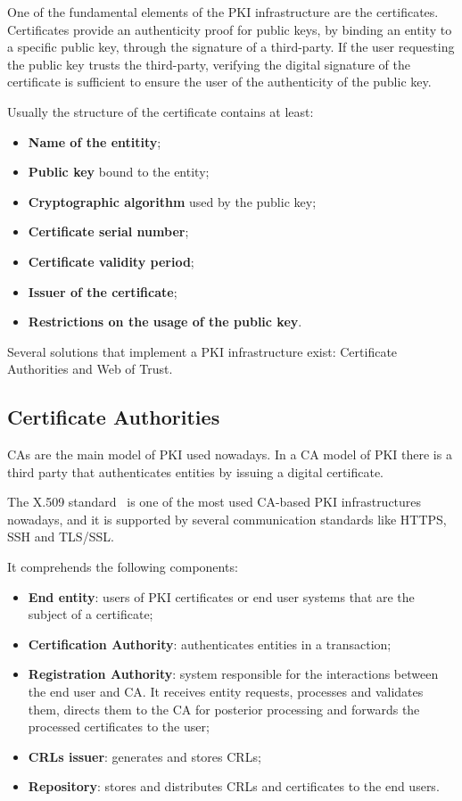 One of the fundamental elements of the \ac{PKI} infrastructure are the certificates.
Certificates provide an authenticity proof for public keys, by binding an entity to a specific public key, through the signature of a third-party. If the user requesting the public key trusts the third-party, verifying the digital signature of the certificate is sufficient to ensure the user of the authenticity of the public key.

Usually the structure of the certificate contains at least:

\begin{itemize}
  \item \textbf{Name of the entitity};
  \item \textbf{Public key} bound to the entity;
  \item \textbf{Cryptographic algorithm} used by the public key;
  \item \textbf{Certificate serial number};
  \item \textbf{Certificate validity period};
  \item \textbf{Issuer of the certificate};
  \item \textbf{Restrictions on the usage of the public key}.
\end{itemize}

Several solutions that implement a \ac{PKI} infrastructure exist: Certificate Authorities and Web of Trust.

\subsection{Certificate Authorities}
\acp{CA} are the main model of \ac{PKI} used nowadays.
In a \ac{CA} model of \ac{PKI} there is a third party that authenticates entities by issuing a digital certificate.

The X.509 standard~\cite{rfc5280}\cite{itut38895} is one of the most used \ac{CA}-based \ac{PKI} infrastructures nowadays, and it is supported by several communication standards like \acs{HTTPS}, \acs{SSH} and \acs{TLS}/\acs{SSL}.

It comprehends the following components:
\begin{itemize}
	\item \textbf{End entity}: users of \ac{PKI} certificates or end user systems that are the subject of a certificate;
	\item \textbf{Certification Authority}: authenticates entities in a transaction;
	\item \textbf{Registration Authority}: system responsible for the interactions between the end user and \ac{CA}. It receives entity requests, processes and validates them, directs them to the \ac{CA} for posterior processing and forwards the processed certificates to the user;
	\item \textbf{\acsp{CRL} issuer}: generates and stores \acp{CRL};
	\item \textbf{Repository}: stores and distributes \acp{CRL} and certificates to the end users.
\end{itemize}

